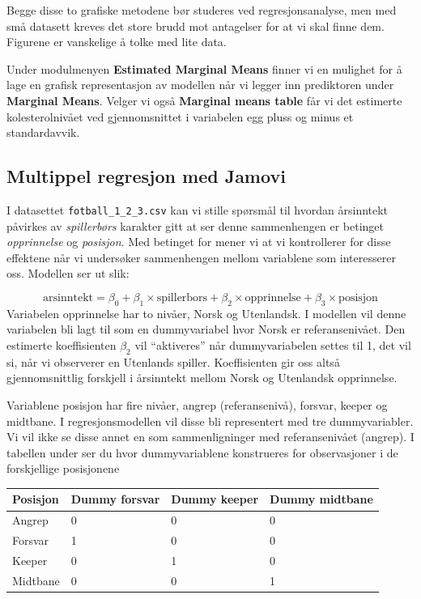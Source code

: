 \documentclass[
  letterpaper,
  DIV=11,
  numbers=noendperiod,
  oneside]{scrreprt}
\begin{document}
Begge disse to grafiske metodene bør studeres ved regresjonsanalyse, men
med små datasett kreves det store brudd mot antagelser for at vi skal
finne dem. Figurene er vanskelige å tolke med lite data.

Under modulmenyen \textbf{Estimated Marginal Means} finner vi en
mulighet for å lage en grafisk representasjon av modellen når vi legger
inn prediktoren under \textbf{Marginal Means}. Velger vi også
\textbf{Marginal means table} får vi det estimerte kolesterolnivået ved
gjennomsnittet i variabelen egg pluss og minus et standardavvik.

\hypertarget{multippel-regresjon-med-jamovi}{%
\subsection{Multippel regresjon med
Jamovi}\label{multippel-regresjon-med-jamovi}}

I datasettet \texttt{fotball\_1\_2\_3.csv} kan vi stille spørsmål til
hvordan årsinntekt påvirkes av \emph{spillerbørs} karakter gitt at ser
denne sammenhengen er betinget \emph{opprinnelse} og \emph{posisjon}.
Med betinget for mener vi at vi kontrollerer for disse effektene når vi
undersøker sammenhengen mellom variablene som interesserer oss. Modellen
ser ut slik:

\[\text{arsinntekt} = \beta_0 + \beta_1\times\text{spillerbors} + \beta_2\times\text{opprinnelse} +\beta_3\times\text{posisjon}\]
Variabelen opprinnelse har to nivåer, Norsk og Utenlandsk. I modellen
vil denne variabelen bli lagt til som en dummyvariabel hvor Norsk er
referansenivået. Den estimerte koeffisienten \(\beta_2\) vil
``aktiveres'' når dummyvariabelen settes til 1, det vil si, når vi
observerer en Utenlands spiller. Koeffisienten gir oss altså
gjennomsnittlig forskjell i årsinntekt mellom Norsk og Utenlandsk
opprinnelse.

Variablene posisjon har fire nivåer, angrep (referansenivå), forsvar,
keeper og midtbane. I regresjonsmodellen vil disse bli representert med
tre dummyvariabler. Vi vil ikke se disse annet en som sammenligninger
med referansenivået (angrep). I tabellen under ser du hvor
dummyvariablene konstrueres for observasjoner i de forskjellige
posisjonene

\begin{longtable}[]{@{}llll@{}}
\toprule\noalign{}
Posisjon & Dummy forsvar & Dummy keeper & Dummy midtbane \\
\midrule\noalign{}
\endhead
\bottomrule\noalign{}
\endlastfoot
Angrep & 0 & 0 & 0 \\
Forsvar & 1 & 0 & 0 \\
Keeper & 0 & 1 & 0 \\
Midtbane & 0 & 0 & 1 \\
\end{longtable}
\end{document}
